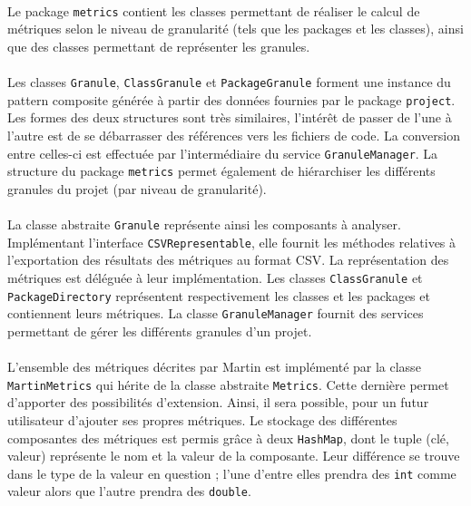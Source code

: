 \documentclass{scrartcl}
\begin{document}
    \paragraph{}Le package \texttt{metrics} contient les classes permettant de réaliser le calcul de métriques selon le niveau de granularité (tels que les packages et les classes), ainsi que des classes permettant de représenter les granules.

    \paragraph{}Les classes \texttt{Granule}, \texttt{ClassGranule} et \texttt{PackageGranule} forment une instance du pattern composite générée à partir des données fournies par le package \texttt{project}. Les formes des deux structures sont très similaires, l'intérêt de passer de l'une à l'autre est de se débarrasser des références vers les fichiers de code. La conversion entre celles-ci est effectuée par l'intermédiaire du service \texttt{GranuleManager}. La structure du package \texttt{metrics} permet également de hiérarchiser les différents granules du projet (par niveau de granularité). 
    
    \paragraph{}La classe abstraite \texttt{Granule} représente ainsi les composants à analyser. Implémentant l'interface \texttt{CSVRepresentable}, elle fournit les méthodes relatives à l'exportation des résultats des métriques au format CSV. La représentation des métriques est déléguée à leur implémentation. Les classes \texttt{ClassGranule} et \texttt{PackageDirectory} représentent respectivement les classes et les packages et contiennent leurs métriques. La classe \texttt{GranuleManager} fournit des services permettant de gérer les différents granules d'un projet.
    
    \paragraph{}L'ensemble des métriques décrites par Martin\cite{Martin:1994} est implémenté par la classe \texttt{MartinMetrics} qui hérite de la classe abstraite \texttt{Metrics}. Cette dernière permet d'apporter des possibilités d'extension. Ainsi, il sera possible, pour un futur utilisateur d'ajouter ses propres métriques. Le stockage des différentes composantes des métriques est permis grâce à deux \texttt{HashMap}, dont le tuple (clé, valeur) représente le nom et la valeur de la composante. Leur différence se trouve dans le type de la valeur en question ; l'une d'entre elles prendra des \texttt{int} comme valeur alors que l'autre prendra des \texttt{double}.
\end{document}
